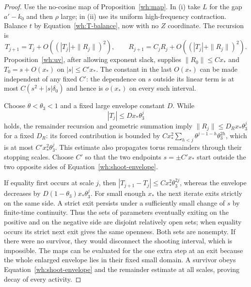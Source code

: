 \begin{proof}
Use the no-cosine map of Proposition~\ref{wh:map}.  In (i) take
$L$ for the gap $a'-k_0$ and then $\rho$ large; in (ii) use its
uniform high-frequency contraction.  Balance $t$ by
Equation~\eqref{wh:T-balance}, now with no $Z$ coordinate.  The
recursion is
\[
 T_{j+1}=T_j+O((|T_j|+\|R_j\|)^2),\qquad
 R_{j+1}=C_jR_j+O((|T_j|+\|R_j\|)^2).
\]
Proposition~\ref{wh:uv}, after allowing exponent slack, supplies
$\|R_0\|\le Cx_*$ and $T_0=s+O(x_*)$ on
$|s|\le C'x_*$.  The constant in the last $O(x_*)$ can be made
independent of any fixed $C'$: the dependence on $s$ outside its
linear term is at most $C(s^2+|s|\delta_0)$ and hence is
$o(x_*)$ on every such interval.

Choose $\theta<\theta_3<1$ and a fixed large envelope constant
$D$.  While
\begin{equation}\label{wh:shoot-envelope}
 |T_j|\le Dx_*\theta_3^j
\end{equation}
holds, the remainder recursion and geometric summation imply
$\|R_j\|\le D_Rx_*\theta_3^j$ for a fixed $D_R$:
its forced contribution is bounded by
$Cx_*^2\sum_{h<j}\theta^{j-1-h}\theta_3^{2h}$, which is at
most $C'x_*^2\theta_3^j$.  This estimate also propagates torus
remainders through their stopping scales.  Choose $C'$ so that
the two endpoints $s=\pm C'x_*$ start outside the two opposite
sides of Equation~\eqref{wh:shoot-envelope}.

If equality first occurs at scale $j$, then
$|T_{j+1}-T_j|\le Cx_*^2\theta_3^{2j}$, whereas the envelope
decreases by $D(1-\theta_3)x_*\theta_3^j$.  For small enough
$x_*$ the next iterate exits strictly on the same side.  A strict
exit persists under a sufficiently small change of $s$ by
finite-time continuity.  Thus the sets of parameters eventually
exiting on the positive and on the negative side are disjoint
relatively open sets; when equality occurs its strict next exit
gives the same openness.  Both sets are nonempty.  If there were
no survivor, they would disconnect the shooting interval, which
is impossible.  The maps can be evaluated for the one extra step
at an exit because the whole enlarged envelope lies in their
fixed small domain.  A survivor obeys
Equation~\eqref{wh:shoot-envelope} and the remainder estimate at
all scales, proving decay of every activity.


\end{proof}
